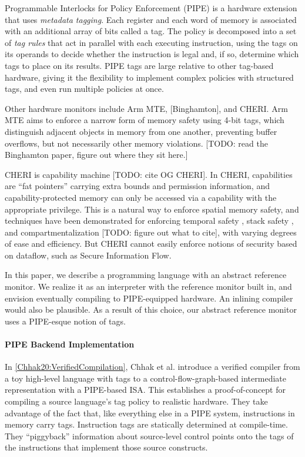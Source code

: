 \documentclass[acmsmall,review,anonymous]{acmart}\settopmatter{printfolios=true,printccs=false,printacmref=false}
\begin{document}
Programmable Interlocks for Policy Enforcement (PIPE) \cite{Dhawan14:PUMP} is a hardware extension
that uses {\em metadata tagging}. Each register and each word of memory is associated with
an additional array of bits called a tag. The policy is decomposed into a set of {\em tag rules}
that act in parallel with each executing instruction, using the tags on its operands to
decide whether the instruction is legal and, if so, determine which tags to place on its results.
PIPE tags are large relative to other tag-based hardware, giving it the flexibility
to implement complex policies with structured tags, and even run multiple policies at once.

Other hardware monitors include Arm MTE, [Binghamton], and CHERI.
Arm MTE aims to enforce a narrow form of memory safety using 4-bit tags, which distinguish adjacent objects
in memory from one another, preventing buffer overflows, but not necessarily other memory violations.
[TODO: read the Binghamton paper, figure out where they sit here.] 

CHERI is capability machine [TODO: cite OG CHERI]. In CHERI, capabilities
are ``fat pointers'' carrying extra bounds and permission information, and capability-protected
memory can only be accessed via a capability with the appropriate privilege. This is a natural
way to enforce spatial memory safety, and techniques have been demonstrated for enforcing
temporal safety \cite{NWF20:Cornucopia}, stack safety \cite{Skorstengaard19:stktokens},
and compartmentalization [TODO: figure out what to cite], with varying degrees of ease and
efficiency. But CHERI cannot easily enforce notions of security based on dataflow,
such as Secure Information Flow.

In this paper, we describe a programming language with an abstract reference monitor.
We realize it as an interpreter with the reference monitor built in, and envision
eventually compiling to PIPE-equipped hardware. An inlining compiler would also be plausible.
As a result of this choice, our abstract reference monitor uses a PIPE-esque notion of
tags.

\paragraph{PIPE Backend Implementation}

In \cref{Chhak20:VerifiedCompilation}, Chhak et al. introduce a verified compiler from a toy
high-level language with tags
to a control-flow-graph-based intermediate representation with a PIPE-based
ISA. This establishes a proof-of-concept for compiling a source language's tag policy to
realistic hardware. They take advantage of the fact that, like everything else in a PIPE system,
instructions in memory carry tags. Instruction tags are statically determined at compile-time.
They ``piggyback'' information about source-level control points onto the tags of the instructions
that implement those source constructs.
\end{document}
